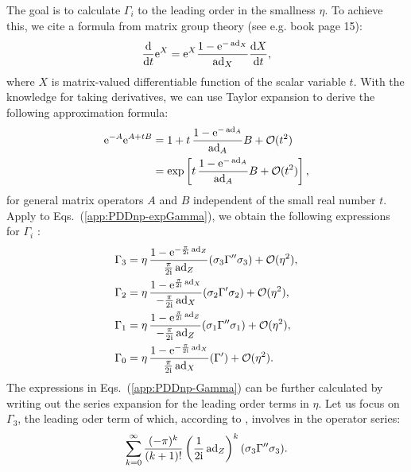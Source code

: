\documentclass[pra,reprint,superscriptaddress]{revtex4-2}
\begin{document}
The goal is to calculate $\Gamma_i$ to the leading order in the smallness $\eta$.
To achieve this, we cite a formula from matrix group theory (see e.g. book \cite{rossmann2006lie} page 15):
\begin{equation}
 \frac{\mathop{}\!\mathrm{d}}{\mathop{}\!\mathrm{d} t} \mathrm{e}^{X} = \mathrm{e}^{X} \frac{1- \mathrm{e}^{-\operatorname{ad}_X}}{\operatorname{ad}_X}\frac{\mathop{}\!\mathrm{d} X}{\mathop{}\!\mathrm{d} t},
\end{equation}
where $X$ is matrix-valued differentiable function of the scalar  variable $t$.
With the knowledge for taking derivatives, we can use Taylor expansion to derive the following approximation formula:
\begin{equation}\label{app:approx-liealgebra}
\begin{aligned}
  \mathrm{e}^{-A} \mathrm{e}^{A+ t B} &= 1 + t\, \frac{1-\mathrm{e}^{-\operatorname{ad}_A}}{\operatorname{ad}_A} B +\mathcal{O}(t^2)\\
 &= \exp\left[t\, \frac{1-\mathrm{e}^{-\operatorname{ad}_A}}{\operatorname{ad}_A} B + \mathcal{O}(t^2)\right],
\end{aligned}
\end{equation}
for general matrix operators $A$ and $B$ independent of the small real number $t$.
Apply   to Eqs.~\!(\ref{app:PDDnp-expGamma}), we obtain the following expressions for $\Gamma_i$ :
\begin{subequations} \label{app:PDDnp-Gamma}
\begin{align}\label{app:PDDnp-Gamma3}
  \Gamma_3 &= \eta\, \frac{1-\mathrm{e}^{-\frac{\pi}{2\mathrm{i}} \operatorname{ad}_Z}}{ \frac{\pi}{2\mathrm{i}} \operatorname{ad}_Z} (\sigma_3\Gamma''\sigma_3) + \mathcal{O}(\eta^2),\\
  \Gamma_2 &= \eta\, \frac{1-\mathrm{e}^{\frac{\pi}{2\mathrm{i}} \operatorname{ad}_X}}{ -\frac{\pi}{2\mathrm{i}} \operatorname{ad}_X} (\sigma_2\Gamma'\sigma_2) + \mathcal{O}(\eta^2),\\
  \Gamma_1 &= \eta\, \frac{1-\mathrm{e}^{\frac{\pi}{2\mathrm{i}} \operatorname{ad}_Z}}{-\frac{\pi}{2\mathrm{i}} \operatorname{ad}_Z} (\sigma_1\Gamma''\sigma_1) + \mathcal{O}(\eta^2),\\
  \Gamma_0 &= \eta\, \frac{1-\mathrm{e}^{-\frac{\pi}{2\mathrm{i}} \operatorname{ad}_X}}{ \frac{\pi}{2\mathrm{i}} \operatorname{ad}_X} (\Gamma') + \mathcal{O}(\eta^2).
\end{align}
\end{subequations}
The expressions in Eqs.~\!(\ref{app:PDDnp-Gamma}) can be further calculated
by writing out the series expansion for the leading order terms in $\eta$. 
Let us focus on $\Gamma_3$, the leading oder term of which, according to ,  involves in the operator series:
\begin{equation}\label{app:PDDnp-G3series}
\sum_{k=0}^\infty \frac{(-\pi)^k }{(k+1)!}
 \left(\frac{1}{2\mathrm{i} }\operatorname{ad}_Z\right)^k(\sigma_3 \Gamma''\sigma_3).
\end{equation}
\end{document}
